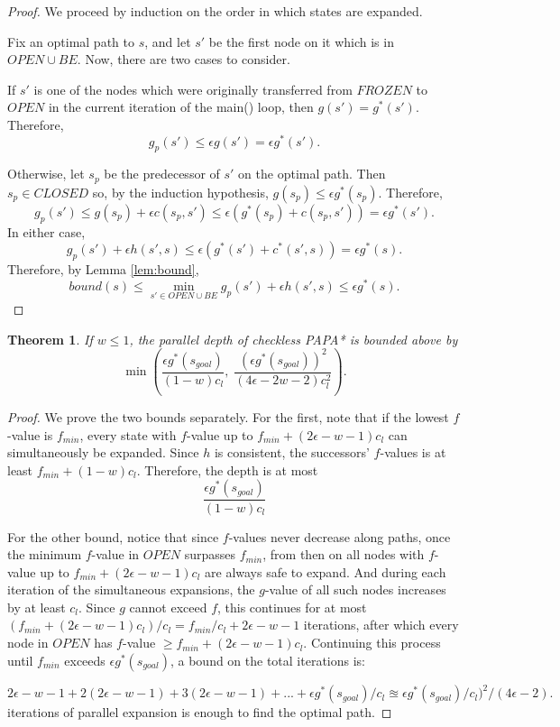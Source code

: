\documentclass[letterpaper]{article}
\newtheorem{thm}{Theorem}
\begin{document}
\begin{proof}
We proceed by induction on the order in which states are expanded.

Fix an optimal path to $s$, and let $s'$ be the first node on it which is in $OPEN \cup BE$. Now, there are two cases to consider.

If $s'$ is one of the nodes which were originally transferred from $FROZEN$ to $OPEN$ in the current iteration of the main() loop, then $g(s') = g^*(s')$. Therefore,
\[g_p(s') \le \epsilon g(s') = \epsilon g^*(s').\]

Otherwise, let $s_p$ be the predecessor of $s'$ on the optimal path. Then $s_p \in CLOSED$ so, by the induction hypothesis, $g(s_p) \le \epsilon g^*(s_p)$. Therefore,
\[g_p(s') \le g(s_p) + \epsilon c(s_p,s') \le \epsilon(g^*(s_p) + c(s_p,s')) = \epsilon g^*(s').\]
In either case,
\[g_p(s') + \epsilon h(s',s) \le \epsilon\left(g^*(s') + c^*(s',s)\right) = \epsilon g^*(s).\]
Therefore, by Lemma \ref{lem:bound},
\[bound(s) \le \min_{s' \in OPEN \cup BE} g_p(s') + \epsilon h(s',s) \le \epsilon g^*(s).\]
\end{proof}

\begin{thm}
\label{thm:depth}
If $w \le 1$, the parallel depth of checkless PAPA* is bounded above by
\[\min\left(\frac{\epsilon g^*(s_{goal})}{(1-w)c_l},\;
\frac{\left(\epsilon g^*(s_{goal})\right)^2 }{(4\epsilon-2w-2)c_l^2}\right).\]
\end{thm}

\begin{proof}
We prove the two bounds separately. For the first, note that if the lowest $f$-value is $f_{min}$, every state with $f$-value up to $f_{min} + (2\epsilon-w-1)c_l$ can simultaneously be expanded. Since $h$ is consistent, the successors' $f$-values is at least $f_{min} + (1-w)c_l$. Therefore, the depth is at most
\[\frac{\epsilon g^*(s_{goal})}{(1-w)c_l}\]

For the other bound, notice that since $f$-values never decrease along paths, once the minimum $f$-value in $OPEN$ surpasses $f_{min}$, from then on all nodes with $f$-value up to $f_{min} + (2\epsilon-w-1)c_l$ are always safe to expand. And during each iteration of the simultaneous expansions, the $g$-value of all such nodes increases by at least $c_l$. Since $g$ cannot exceed $f$, this continues for at most $(f_{min} + (2\epsilon-w-1)c_l) / c_l = f_{min}/c_l + 2\epsilon-w-1$ iterations, after which every node in $OPEN$ has $f$-value $\ge f_{min} + (2\epsilon-w-1)c_l$. Continuing this process until $f_{min}$ exceeds $\epsilon g^*(s_{goal})$, a bound on the total iterations is:

$2\epsilon-w-1 + 2(2\epsilon-w-1) + 3(2\epsilon-w-1) + ... + \epsilon g^*(s_{goal})/c_l
\approxeq \epsilon g^*(s_{goal})/c_l )^2 / ( 4\epsilon-2 ).$
iterations of parallel expansion is enough to find the optimal path.
\end{proof}
\end{document}
